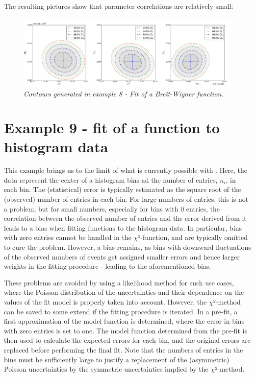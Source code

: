 \documentclass[a4paper,10pt,english]{sphinxmanual}
\begin{document}
The resulting pictures show that parameter correlations are
relatively small:
\begin{figure}[htbp]
\centering
\capstart

\includegraphics{kafe_BreitWignerFit_contours.png}
\caption{\emph{Contours generated in example 8 - Fit of a Breit-Wigner function.}}\end{figure}


\section{Example 9 - fit of a function to histogram data}
\label{index:example-9-fit-of-a-function-to-histogram-data}
This example brings us to the limit of what is currently
possible with . Here, the data represent the
center of a histogram bins ad the number of entries, $n_i$,
in each bin. The (statistical) error is typically estimated
as the square root of the (observed) number of entries in each bin.
For large numbers of entries, this is not a problem,
but for small numbers, especially for bins with 0 entries,
the correlation between the observed number of entries and
the error derived from it leads to a bias when fitting
functions to the histogram data. In particular, bins with
zero entries cannot be handled in the \(\chi\)²-function, and are
typically omitted to cure the problem.  However, a bias
remains, as bins with downward fluctuations of the
observed numbers of events get assigned smaller errors
and hence larger weights in the fitting procedure - leading
to the aforementioned bias.

These problems are avoided by using a likelihood method for
such use cases, where the Poisson distribution of the uncertainties
and their dependence on the values of the fit model is properly
taken into account. However, the \(\chi\)²-method can be saved to some
extend if the fitting procedure is iterated. In a pre-fit, a
first approximation of the model function is determined, where
the error in bins with zero entries is set to one. The model
function determined from the pre-fit is then used to calculate
the expected errors for each bin, and the original errors are
replaced before performing the final fit. Note that the numbers
of entries in the bins must be sufficiently large to justify
a replacement of the (asymmetric) Poisson uncertainties by
the symmetric uncertainties implied by the \(\chi\)²-method.
\end{document}

